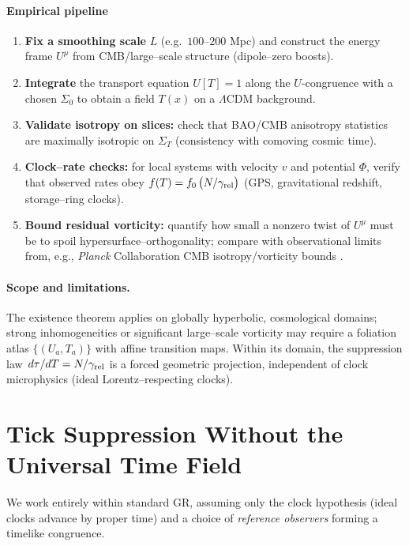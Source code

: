 \documentclass[12pt]{article}
\theoremstyle{plain}
\begin{document}
\paragraph{Empirical pipeline}
\begin{enumerate}
  \item \textbf{Fix a smoothing scale} $L$ (e.g.\ $100$--$200$ Mpc) and construct the energy frame $U^\mu$ from CMB/large–scale structure (dipole–zero boosts).
  \item \textbf{Integrate} the transport equation $U[T]=1$ along the $U$-congruence with a chosen $\Sigma_0$ to obtain a field $T(x)$ on a $\Lambda$CDM background.
  \item \textbf{Validate isotropy on slices:} check that BAO/CMB anisotropy statistics are maximally isotropic on $\Sigma_T$ (consistency with comoving cosmic time).
  \item \textbf{Clock–rate checks:} for local systems with velocity $v$ and potential $\Phi$, verify that observed rates obey $f(T)=f_0\,\big(N/\gamma_{\rm rel}\big)$ (GPS, gravitational redshift, storage–ring clocks).
  \item \textbf{Bound residual vorticity:} quantify how small a nonzero twist of $U^\mu$ must be to spoil hypersurface–orthogonality; compare with observational limits from, e.g., \emph{Planck} Collaboration CMB isotropy/vorticity bounds \cite{PlanckVorticityConstraint,PlanckIsotropy2018}.
\end{enumerate}

\paragraph{Scope and limitations.}
The existence theorem applies on globally hyperbolic, cosmological domains; strong inhomogeneities or significant large–scale vorticity may require a foliation atlas $\{(U_a,T_a)\}$ with affine transition maps. Within its domain, the suppression law \(\,d\tau/dT=N/\gamma_{\rm rel}\) is a forced geometric projection, independent of clock microphysics (ideal Lorentz–respecting clocks).

\newpage


\section{Tick Suppression Without the Universal Time Field}
\label{sec:SuppNoT}

We work entirely within standard GR, assuming only the clock hypothesis (ideal clocks
advance by proper time) and a choice of \emph{reference observers} forming a timelike
congruence.
\end{document}
